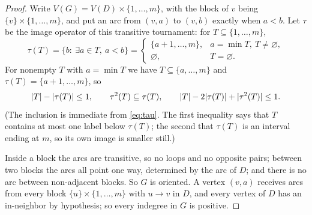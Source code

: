 \begin{proof}
Write $V(G)=V(D)\times\{1,\dots,m\}$, with the block of $v$ being $\{v\}\times\{1,\dots,m\}$, and
put an arc from $(v,a)$ to $(v,b)$ exactly when $a<b$. Let $\tau$ be the image operator of this
transitive tournament: for $T\subseteq\{1,\dots,m\}$,
\begin{equation}\label{eq:tau}
 \tau(T)=\{b:\ \exists a\in T,\ a<b\}
 =\begin{cases}\{a+1,\dots,m\},&a=\min T,\ T\ne\varnothing,\\ \varnothing,&T=\varnothing.\end{cases}
\end{equation}
For nonempty $T$ with $a=\min T$ we have $T\subseteq\{a,\dots,m\}$ and $\tau(T)=\{a+1,\dots,m\}$,
so
\begin{equation}\label{eq:tau-bounds}
 \lvert T\rvert-\lvert \tau(T)\rvert\le1,\qquad
 \tau^2(T)\subseteq\tau(T),\qquad
 \lvert T\rvert-2\lvert \tau(T)\rvert+\lvert \tau^2(T)\rvert\le1 .
\end{equation}
(The inclusion is immediate from \eqref{eq:tau}. The first inequality says that $T$ contains at
most one label below $\tau(T)$; the second that $\tau(T)$ is an interval ending at $m$, so its own
image is smaller still.)

Inside a block the arcs are transitive, so no loops and no opposite pairs; between two blocks the
arcs all point one way, determined by the arc of $D$; and there is no arc between non-adjacent
blocks. So $G$ is oriented. A vertex $(v,a)$ receives arcs from every block $\{u\}\times\{1,\dots,m\}$
with $u\to v$ in $D$, and every vertex of $D$ has an in-neighbor by hypothesis; so every indegree in
$G$ is positive.


\end{proof}

